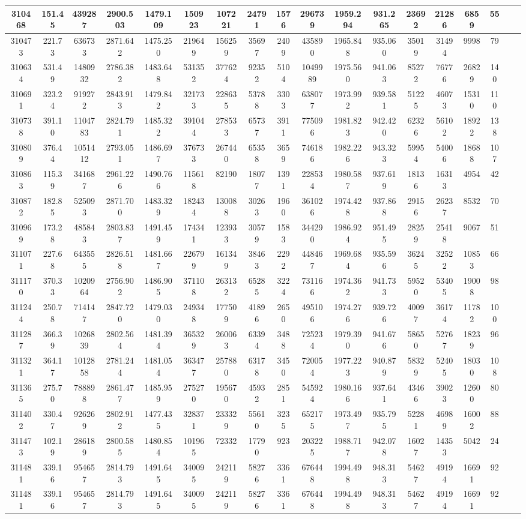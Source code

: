 \documentclass[10pt]{extarticle}
\begin{document}
\begin{longtable}{|c|c|c|c|c|c|c|c|c|c|c|c|c|c|c|c|c|c|}
\hline 
310468&151.45&439287&2900.503&1479.109&150923&107221&24791&1576&296739&1959.294&931.265&23692&21286&6859&55 \\ 
\hline 
310473&221.73&636733&2871.642&1475.250&219649&156259&35697&2409&435890&1965.848&935.060&35019&31494&9998&79 \\ 
\hline 
310634&531.49&1480932&2786.382&1483.648&531352&377624&92352&5104&1049989&1975.560&941.063&85272&76776&26829&140 \\ 
\hline 
310691&323.24&919272&2843.913&1479.842&321733&228635&53788&3303&638077&1973.992&939.581&51225&46073&15310&110 \\ 
\hline 
310738&391.10&1104783&2824.791&1485.322&391044&278533&65737&3911&775096&1981.823&942.420&62326&56102&18922&138 \\ 
\hline 
310809&376.44&1051412&2793.051&1486.697&376733&267440&65358&3659&746186&1982.226&943.323&59954&54006&18688&107 \\ 
\hline 
310863&115.39&341687&2961.226&1490.766&115618&82190&18077&1391&228534&1980.587&937.619&18136&16313&4954&42 \\ 
\hline 
310872&182.85&525093&2871.700&1483.329&182434&130088&30263&1960&361026&1974.428&937.868&29156&26237&8532&70 \\ 
\hline 
310969&173.28&485843&2803.837&1491.459&174341&123933&30579&1583&344290&1986.924&951.495&28259&25418&9067&51 \\ 
\hline 
311071&227.68&643555&2826.518&1481.667&226799&161349&38463&2292&448467&1969.684&935.596&36245&32522&10853&66 \\ 
\hline 
311170&370.33&1020964&2756.902&1486.905&371108&263132&65285&3224&731166&1974.362&941.733&59520&53405&19008&98 \\ 
\hline 
311244&250.78&714147&2847.720&1479.030&249348&177509&41896&2650&495106&1974.276&939.726&40097&36174&11782&100 \\ 
\hline 
311287&366.39&1026839&2802.564&1481.394&365329&260063&63394&3488&725234&1979.390&941.676&58650&52767&18239&96 \\ 
\hline 
311321&364.17&1012858&2781.244&1481.054&363477&257880&63178&3450&720054&1977.223&940.879&58329&52405&18030&108 \\ 
\hline 
311365&275.70&788898&2861.477&1485.959&275270&195670&45932&2851&545924&1980.166&937.641&43466&39023&12600&80 \\ 
\hline 
311402&330.47&926269&2802.912&1477.435&328371&233329&55610&3235&652175&1973.497&935.795&52281&46989&16002&88 \\ 
\hline 
311473&102.19&286189&2800.585&1480.854&101965&72332&17790&923&203225&1988.717&942.078&16027&14353&5042&24 \\ 
\hline 
311481&339.16&954657&2814.793&1491.645&340095&242119&58276&3361&676448&1994.498&948.313&54627&49194&16691&92 \\ 
\hline 
311481&339.16&954657&2814.793&1491.645&340095&242119&58276&3361&676448&1994.498&948.313&54627&49194&16691&92 \\ 
\hline 
\end{longtable} 
\end{document}

